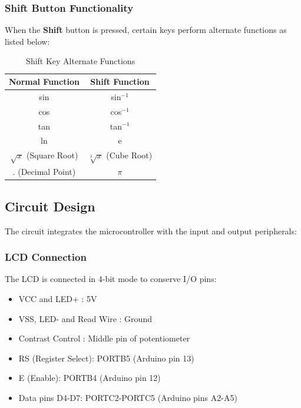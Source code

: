 \documentclass[12pt]{article}
\begin{document}
\subsubsection{Shift Button Functionality}
When the \textbf{Shift} button is pressed, certain keys perform alternate functions as listed below:

\begin{table}[H]
    \centering
    \begin{tabular}{|c|c|}
        \hline
        \textbf{Normal Function} & \textbf{Shift Function} \\  
        \hline
        sin  & sin$^{-1}$ \\  
        cos  & cos$^{-1}$ \\  
        tan  & tan$^{-1}$ \\  
        ln   & e  \\
        $\sqrt{x}$ (Square Root) & $\sqrt[3]{x}$ (Cube Root) \\   
        . (Decimal Point) & $\pi$ \\  
        \hline
    \end{tabular}
    \caption{Shift Key Alternate Functions}
    \label{tab:shift_functions}
\end{table}




\subsection{Circuit Design}
The circuit integrates the microcontroller with the input and output peripherals:

\subsubsection{LCD Connection}
The LCD is connected in 4-bit mode to conserve I/O pins:
\begin{itemize}
    \item VCC and LED+ : 5V
    \item VSS, LED- and Read Wire : Ground
    \item Contrast Control : Middle pin of potentiometer
    \item RS (Register Select): PORTB5 (Arduino pin 13)
    \item E (Enable): PORTB4 (Arduino pin 12)
    \item Data pins D4-D7: PORTC2-PORTC5 (Arduino pins A2-A5)
\end{itemize}
\end{document}
